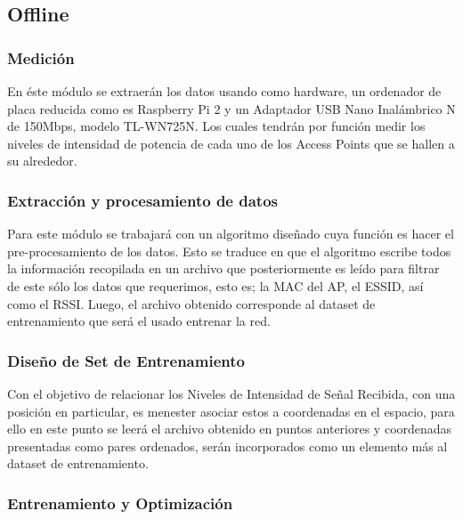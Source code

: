 \subsection{Offline}
\subsubsection{Medición}

En éste módulo se extraerán los datos usando como hardware, un ordenador de placa reducida como es Raspberry Pi 2 y un Adaptador USB Nano Inalámbrico N de 150Mbps, modelo TL-WN725N. Los cuales tendrán por función medir los niveles de intensidad de potencia de cada uno de los Access Points que se hallen a su alrededor.



\subsubsection{Extracción y procesamiento de datos}

Para este módulo se trabajará con un algoritmo diseñado cuya función es hacer el pre-procesamiento de los datos. Esto se traduce en que el algoritmo escribe todos la información recopilada en un archivo que posteriormente es leído para filtrar de este sólo los datos que requerimos, esto es; la MAC del AP, el \ac{ESSID}, así como el \ac{RSSI}. Luego, el archivo obtenido corresponde al dataset de entrenamiento que será el usado entrenar la red.

\subsubsection{Diseño de Set de Entrenamiento}

Con el objetivo de relacionar los Niveles de Intensidad de Señal Recibida, con una posición en particular, es menester asociar estos a coordenadas en el espacio, para ello en este punto se leerá el archivo obtenido en puntos anteriores y coordenadas presentadas como pares ordenados, serán incorporados como un elemento más al dataset de entrenamiento.

\subsubsection{Entrenamiento y Optimización}

